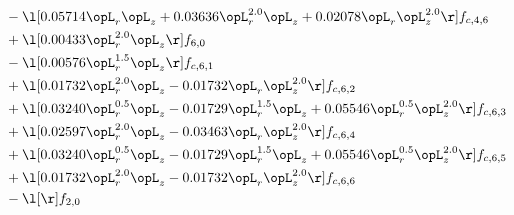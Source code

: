 \begin{alignat}{2}
& - \l[  0.05714 \opL_r \opL_z +  0.03636 \opL_r^{2.0} \opL_z +  0.02078 \opL_r \opL_z^{2.0}  \r] f_{c,4,6} \nonumber \\ 
& + \l[  0.00433 \opL_r^{2.0} \opL_z  \r] f_{6,0} \nonumber \\ 
& - \l[  0.00576 \opL_r^{1.5} \opL_z  \r] f_{c,6,1} \nonumber \\ 
& + \l[  0.01732 \opL_r^{2.0} \opL_z   -0.01732 \opL_r \opL_z^{2.0}  \r] f_{c,6,2} \nonumber \\ 
& + \l[  0.03240 \opL_r^{0.5} \opL_z   -0.01729 \opL_r^{1.5} \opL_z +  0.05546 \opL_r^{0.5} \opL_z^{2.0}  \r] f_{c,6,3} \nonumber \\ 
& + \l[  0.02597 \opL_r^{2.0} \opL_z   -0.03463 \opL_r \opL_z^{2.0}  \r] f_{c,6,4} \nonumber \\ 
& + \l[  0.03240 \opL_r^{0.5} \opL_z   -0.01729 \opL_r^{1.5} \opL_z +  0.05546 \opL_r^{0.5} \opL_z^{2.0}  \r] f_{c,6,5} \nonumber \\ 
& + \l[  0.01732 \opL_r^{2.0} \opL_z   -0.01732 \opL_r \opL_z^{2.0}  \r] f_{c,6,6} \nonumber \\ 
& - \l[  \r] f_{2,0} \nonumber \\ 
\end{alignat} 



